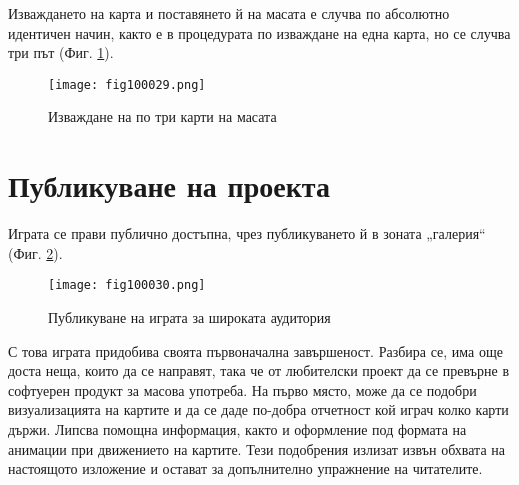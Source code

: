 Изваждането на карта и поставянето й на масата е случва по абсолютно идентичен начин, както е в процедурата по изваждане на една карта, но се случва три път (Фиг. \ref{fig100029}).

\begin{figure}[H]
  \centering
  \texttt{[image: fig100029.png]}
  \caption{Изваждане на по три карти на масата}
\label{fig100029}
\end{figure}

\section{Публикуване на проекта}

Играта се прави публично достъпна, чрез публикуването й в зоната „галерия“ (Фиг. \ref{fig100030}).

\begin{figure}[H]
  \centering
  \texttt{[image: fig100030.png]}
  \caption{Публикуване на играта за широката аудитория}
\label{fig100030}
\end{figure}

С това играта придобива своята първоначална завършеност. Разбира се, има още доста неща, които да се направят, така че от любителски проект да се превърне в софтуерен продукт за масова употреба. На първо място, може да се подобри визуализацията на картите и да се даде по-добра отчетност кой играч колко карти държи. Липсва помощна информация, както и оформление под формата на анимации при движението на картите. Тези подобрения излизат извън обхвата на настоящото изложение и остават за допълнително упражнение на читателите. 
